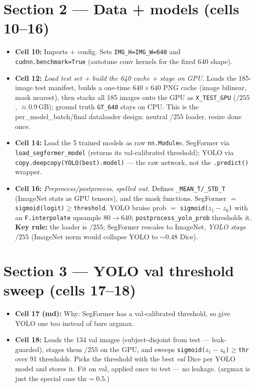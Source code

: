 \documentclass[11pt]{article}
\newcommand{\code}[1]{\texttt{\small #1}}
\begin{document}
\section*{Section 2 --- Data + models (cells 10--16)}
\begin{itemize}
\item \textbf{Cell 10:} Imports + config. Sets \code{IMG\_H=IMG\_W=640} and \code{cudnn.benchmark=True} (autotune conv kernels for the fixed $640$ shape).
\item \textbf{Cell 12:} \emph{Load test set + build the 640 cache + stage on GPU.} Loads the 185-image test manifest, builds a one-time $640\times640$ PNG cache (image bilinear, mask nearest), then stacks all 185 images onto the GPU as \code{X\_TEST\_GPU} ($/255$, $\approx$0.9\,GB); ground truth \code{GT\_640} stays on CPU. This is the per\_model\_batch/final dataloader design: neutral $/255$ loader, resize done once.
\item \textbf{Cell 14:} Load the 5 trained models as raw \code{nn.Module}s. SegFormer via \code{load\_segformer\_model} (returns its val-calibrated threshold); YOLO via \code{copy.deepcopy(YOLO(best).model)} --- the raw network, not the \code{.predict()} wrapper.
\item \textbf{Cell 16:} \emph{Preprocess/postprocess, spelled out.} Defines \code{\_MEAN\_T/\_STD\_T} (ImageNet stats as GPU tensors), and the mask functions. SegFormer $=$ \code{sigmoid(logit)$\geq$threshold}. YOLO bruise prob $=$ \code{sigmoid($z_1-z_0$)} with an \code{F.interpolate} upsample $80\to640$; \code{postprocess\_yolo\_prob} thresholds it. \textbf{Key rule:} the loader is $/255$; SegFormer rescales to ImageNet, \emph{YOLO stays $/255$} (ImageNet norm would collapse YOLO to $\sim$0.48 Dice).
\end{itemize}

\section*{Section 3 --- YOLO val threshold sweep (cells 17--18)}
\begin{itemize}
\item \textbf{Cell 17 (md):} Why: SegFormer has a val-calibrated threshold, so give YOLO one too instead of bare argmax.
\item \textbf{Cell 18:} Loads the 134 val images (subject-disjoint from test --- leak-guarded), stages them $/255$ on the GPU, and sweeps \code{sigmoid($z_1-z_0$)$\geq$thr} over 91 thresholds. Picks the threshold with the best \emph{val} Dice per YOLO model and stores it. Fit on val, applied once to test --- no leakage. (argmax is just the special case thr$=0.5$.)
\end{itemize}
\end{document}
